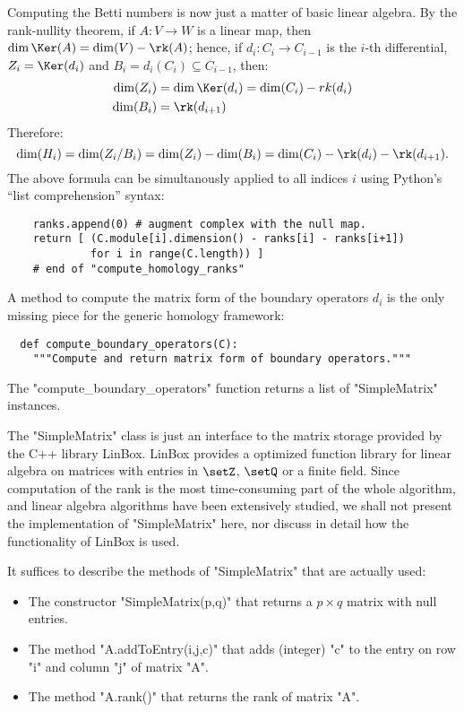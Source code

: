 Computing the Betti numbers is now just a matter of basic linear algebra.
By the rank-nullity theorem, if $A:V\to W$ is a linear map,
then $\dim\Ker(A) =  \dim(V) - \rk(A)$; hence, if $d_i: C_i \to
C_{i-1}$ is the $i$-th differential, $Z_i = \Ker(d_i)$ and $B_i =
d_i(C_i) \subseteq C_{i-1}$, then:
\begin{align*}
  \dim(Z_i) &= \dim\Ker(d_i) = \dim(C_i) - rk(d_i) 
  \\
  \dim(B_i) &= \rk(d_{i+1})
\end{align*}
Therefore:
\begin{equation*}
  \dim(H_i) = \dim(Z_i / B_i) = \dim(Z_i) - \dim(B_i)
            = \dim(C_i) - \rk(d_i) - \rk(d_{i+1}).
\end{equation*}
The above formula can be simultanously applied to all indices $i$
using Python's ``list comprehension'' syntax:
\begin{lstlisting}
    ranks.append(0) # augment complex with the null map.
    return [ (C.module[i].dimension() - ranks[i] - ranks[i+1])
             for i in range(C.length)) ]
    # end of "compute_homology_ranks"

\end{lstlisting}

A method to compute the matrix form of the boundary operators $d_i$ is
the only missing piece for the generic homology framework:
\begin{lstlisting}
  def compute_boundary_operators(C):
    """Compute and return matrix form of boundary operators."""

\end{lstlisting}
The "compute_boundary_operators" function returns a list of
"SimpleMatrix" instances.  

The "SimpleMatrix" class is just an interface to the matrix storage
provided by the C++ library LinBox.  LinBox provides
a optimized function library for linear algebra on matrices with
entries in $\setZ$, $\setQ$ or a finite field.  Since computation of
the rank is the most time-consuming part of the whole algorithm, and
linear algebra algorithms have been extensively
studied, we shall not present the implementation of
"SimpleMatrix" here, nor discuss in detail how the functionality of
LinBox is used.  

It suffices to describe the methods of "SimpleMatrix" that are
actually used:
\begin{itemize}
\item The constructor "SimpleMatrix(p,q)" that returns a $p \times q$
  matrix with null entries.
\item The method "A.addToEntry(i,j,c)" that adds (integer) "c" to the
  entry on row "i" and column "j" of matrix "A".
\item The method "A.rank()" that returns the rank of matrix "A".
\end{itemize}

